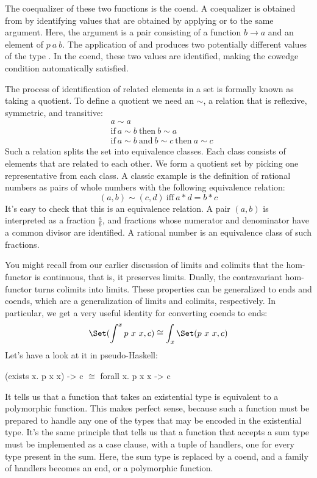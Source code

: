 The coequalizer of these two functions is the coend. A coequalizer is
obtained from  by identifying values that are
obtained by applying  or  to the same
argument. Here, the argument is a pair consisting of a function
$b \to a$ and an element of $p\ a\ b$. The
application of  and  produces two potentially
different values of the type . In the coend, these
two values are identified, making the cowedge condition automatically
satisfied.

The process of identification of related elements in a set is formally
known as taking a quotient. To define a quotient we need an
 $\sim$, a relation that
is reflexive, symmetric, and transitive:
\begin{align*}
   & a \sim a                                                         \\
   & \text{if}\ a \sim b\ \text{then}\ b \sim a                       \\
   & \text{if}\ a \sim b\ \text{and}\ b \sim c\ \text{then}\ a \sim c
\end{align*}
Such a relation splits the set into equivalence classes. Each class
consists of elements that are related to each other. We form a quotient
set by picking one representative from each class. A classic example is
the definition of rational numbers as pairs of whole numbers with the
following equivalence relation:
\[(a, b) \sim (c, d)\ \text{iff}\ a * d = b * c\]
It's easy to check that this is an equivalence relation. A pair
$(a, b)$ is interpreted as a fraction $\frac{a}{b}$, and
fractions whose numerator and denominator have a common divisor are identified. A rational number
is an equivalence class of such fractions.

You might recall from our earlier discussion of limits and colimits that
the hom-functor is continuous, that is, it preserves limits. Dually, the
contravariant hom-functor turns colimits into limits. These properties
can be generalized to ends and coends, which are a generalization of
limits and colimits, respectively. In particular, we get a very useful
identity for converting coends to ends:
\[\Set(\int^x p\ x\ x, c) \cong \int_x \Set(p\ x\ x, c)\]
Let's have a look at it in pseudo-Haskell:

\begin{snipv}
(exists x. p x x) -> c \ensuremath{\cong} forall x. p x x -> c
\end{snipv}
It tells us that a function that takes an existential type is equivalent
to a polymorphic function. This makes perfect sense, because such a
function must be prepared to handle any one of the types that may be
encoded in the existential type. It's the same principle that tells us
that a function that accepts a sum type must be implemented as a case
clause, with a tuple of handlers, one for every type present in the
sum. Here, the sum type is replaced by a coend, and a family of handlers
becomes an end, or a polymorphic function.

